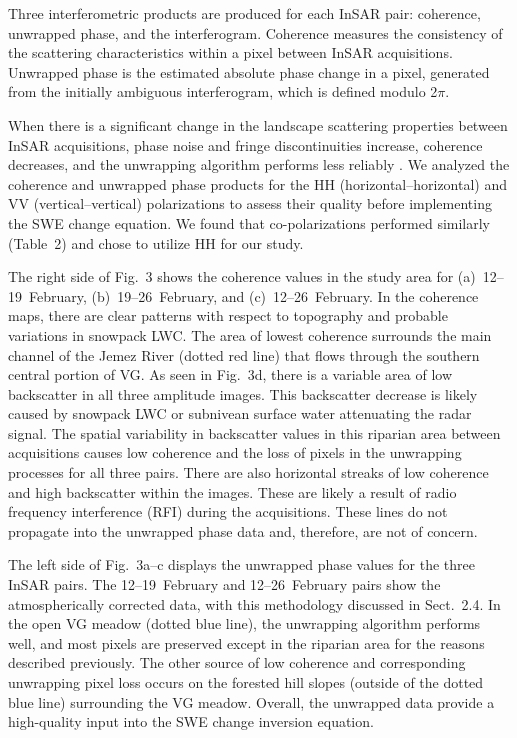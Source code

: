 Three interferometric products are produced for each InSAR pair: coherence, unwrapped phase, and the interferogram. Coherence measures the consistency of the scattering characteristics within a pixel between InSAR acquisitions. Unwrapped phase is the estimated absolute phase change in a pixel, generated from the initially ambiguous interferogram, which is defined modulo 2$\pi$.

When there is a significant change in the landscape scattering properties between InSAR acquisitions, phase noise and fringe discontinuities increase, coherence decreases, and the unwrapping algorithm performs less reliably \citep{balzterForestMappingMonitoring2001}. We analyzed the coherence and unwrapped phase products for the HH (horizontal--horizontal) and VV (vertical--vertical) polarizations to assess their quality before implementing the SWE change equation. We found that co-polarizations performed similarly (Table~2) and chose to utilize HH for our study.

The right side of Fig.~3 shows the coherence values in the study area for (a)~12--19~February, (b)~19--26~February, and (c)~12--26~February. In the coherence maps, there are clear patterns with respect to topography and probable variations in snowpack LWC. The area of lowest coherence surrounds the main channel of the Jemez River (dotted red line) that flows through the southern central portion of VG. As seen in Fig.~3d, there is a variable area of low backscatter in all three amplitude images. This backscatter decrease is likely caused by snowpack LWC or subnivean surface water attenuating the radar signal. The spatial variability in backscatter values in this riparian area between acquisitions causes low coherence and the loss of pixels in the unwrapping processes for all three pairs. There are also horizontal streaks of low coherence and high backscatter within the images. These are likely a result of radio frequency interference (RFI) during the acquisitions. These lines do not propagate into the unwrapped phase data and, therefore, are not of concern.

The left side of Fig.~3a--c displays the unwrapped phase values for the three InSAR pairs. The 12--19~February and 12--26~February pairs show the atmospherically corrected data, with this methodology discussed in Sect.~2.4. In the open VG meadow (dotted blue line), the unwrapping algorithm performs well, and most pixels are preserved except in the riparian area for the reasons described previously. The other source of low coherence and corresponding unwrapping pixel loss occurs on the forested hill slopes (outside of the dotted blue line) surrounding the VG meadow. Overall, the unwrapped data provide a high-quality input into the SWE change inversion equation.

